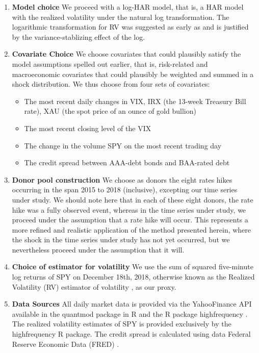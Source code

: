 \documentclass{uiucthesis2021}
\theoremstyle{definition}
\begin{document}
  \begin{enumerate}
    \item \textbf{Model choice}  We proceed with a log-HAR model, that is, a HAR model with the realized volatility under the natural log transformation.  The logarithmic transformation for RV was suggested as early as \cite{corsi2009simple} and is justified by the variance-stablizing effect of the log.
    
  
    \item \textbf{Covariate Choice} We choose covariates that could plausibly satisfy the model assumptions spelled out earlier, that is, risk-related and macroeconomic covariates that could plausibly be weighted and summed in a shock distribution.  We thus choose from four sets of covariates:
    
    \begin{itemize}
    \item The most recent daily changes in VIX, IRX (the 13-week Treasury Bill rate), XAU (the spot price of an ounce of gold bullion)
    \item The most recent closing level of the VIX
    \item The change in the volume SPY on the most recent trading day
    \item The credit spread between AAA-debt bonds and BAA-rated debt
    \end{itemize}
  
    \item \textbf{Donor pool construction} We choose as donors the eight rates hikes occurring in the span 2015 to 2018 (inclusive), excepting our time series under study.  We should note here that in each of these eight donors, the rate hike was a fully observed event, whereas in the time series under study, we proceed under the assumption that a rate hike will occur.  This represents a more refined and realistic application of the method presented herein, where the shock in the time series under study has not yet occurred, but we nevertheless proceed under the assumption that it will.
  
    \item \textbf{Choice of estimator for volatility} We use the sum of squared five-minute log returns of SPY on December 18th, 2018, otherwise known as the Realized Volatility (RV) estimator of volatility \parencite[][]{andersen2008realized}, as our proxy.
    \item \textbf{Data Sources} All daily market data is provided via the YahooFinance API available in the quantmod package in R \parencite[][]{ryan2015package} and the R package highfrequency \cite[][]{highfrequency}.  The realized volatility estimates of SPY is provided exclusively by the highfrequency R package.  The credit spread is calculated using data Federal Reserve Economic Data (FRED) \parencite[][]{boysel2021package}.
  \end{enumerate} 
  
\end{document}
